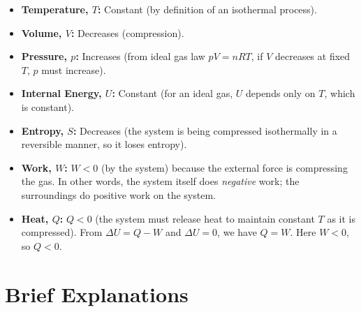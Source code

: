 \documentclass[12pt]{article}
\theoremstyle{definition} %
\theoremstyle{plain} %
\begin{document}
\begin{itemize}
  \item \textbf{Temperature, $T$:} Constant (by definition of an isothermal process).
  \item \textbf{Volume, $V$:} Decreases (compression).
  \item \textbf{Pressure, $p$:} Increases (from ideal gas law $pV=nRT$, if $V$ decreases at fixed $T$, $p$ must increase).
  \item \textbf{Internal Energy, $U$:} Constant (for an ideal gas, $U$ depends only on $T$, which is constant).
  \item \textbf{Entropy, $S$:} Decreases (the system is being compressed isothermally in a reversible manner, so it loses entropy).
  \item \textbf{Work, $W$:} $W<0$ (by the system) because the external force is compressing the gas. 
    In other words, the system itself does \emph{negative} work; the surroundings do positive work on the system.
  \item \textbf{Heat, $Q$:} $Q<0$ (the system must release heat to maintain constant $T$ as it is compressed). 
    From $\Delta U= Q - W$ and $\Delta U=0$, we have $Q = W$. Here $W<0$, so $Q<0$.
\end{itemize}

\section*{Brief Explanations}
\end{document}
